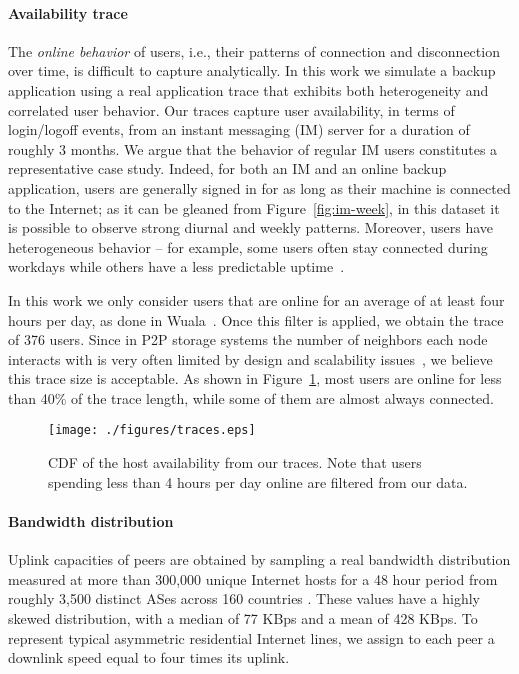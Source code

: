 \paragraph*{\textbf{Availability trace}} The \emph{online behavior} of users,
i.e., their patterns of connection and disconnection over time, is
difficult to capture analytically. In this work we simulate a backup
application using a real application trace that exhibits both
heterogeneity and correlated user behavior. Our traces capture user
availability, in terms of login/logoff events, from an instant
messaging (IM) server for a duration of roughly 3 months. We argue
that the behavior of regular IM users constitutes a representative
case study. Indeed, for both an IM and an online backup application,
users are generally signed in for as long as their machine is
connected to the Internet; as it can be gleaned from
Figure~\vref{fig:im-week}, in this dataset it is possible to observe
strong diurnal and weekly patterns. Moreover, users have heterogeneous
behavior -- for example, some users often stay connected during
workdays while others have a less predictable uptime~\cite{bttf}.

In this work we only consider users that are online for an average of
at least four hours per day, as done in Wuala~\cite{mager09}. Once
this filter is applied, we obtain the trace of 376 users. Since in P2P
storage systems the number of neighbors each node interacts with is
very often limited by design and scalability issues~\cite{p2p11}, we
believe this trace size is acceptable.  As shown in
Figure~\ref{fig:traces}, most users are online for less than 40\% of the
trace length, while some of them are almost always connected.

\begin{figure}
  \centering
  \texttt{[image: ./figures/traces.eps]}
\caption{CDF of the host availability from our traces. Note that users
spending less than 4 hours per day online are filtered from our data.}
\label{fig:traces}
\end{figure}

\paragraph*{\textbf{Bandwidth distribution}} Uplink capacities of peers are
obtained by sampling a real bandwidth distribution measured at more
than 300,000 unique Internet hosts for a 48 hour period from roughly
3,500 distinct ASes across 160 countries
\cite{Piatek07doincentives}. These values have a highly skewed
distribution, with a median of 77 KBps and a mean of 428 KBps. To
represent typical asymmetric residential Internet lines, we assign to
each peer a downlink speed equal to four times its uplink.


